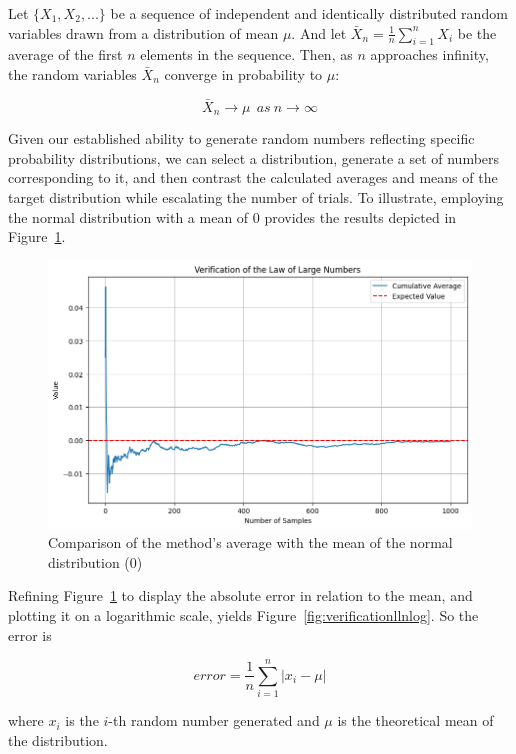\documentclass{article}
\begin{document}
\begin{theorem}
 Let \(\{X_1, X_2, ...\}\) be a sequence of independent and identically distributed random variables drawn from a distribution of mean \(\mu\). And let \(\bar{X}_n = \frac{1}{n}\sum_{i=1}^{n} X_i\) be the average of the first \(n\) elements in the sequence. Then, as \(n\) approaches infinity, the random variables \(\bar{X}_n\) converge in probability to \(\mu\):

 \begin{equation}
	 \bar{X}_n \rightarrow \mu \ \ as \ n \rightarrow \infty
\end{equation}

\end{theorem}

Given our established ability to generate random numbers reflecting specific probability distributions, we can select a distribution, generate a set of numbers corresponding to it, and then contrast the calculated averages and means of the target distribution while escalating the number of trials. To illustrate, employing the normal distribution with a mean of 0 provides the results depicted in Figure~\ref{fig:verificationlln}.

\begin{figure}[H]
	\centering
	\includegraphics[width=0.5\linewidth]{./Figures/LLN/verif.png}
	\caption{Comparison of the method's average with the mean of the normal distribution (0)}
	\label{fig:verificationlln}
\end{figure}

Refining Figure~\ref{fig:verificationlln} to display the absolute error in relation to the mean, and plotting it on a logarithmic scale, yields Figure~\ref{fig:verificationllnlog}. So the error is

\begin{equation*} error = \frac{1}{n}\sum_{i=1}^{n} | x_i - \mu | \end{equation*}

where \(x_i\) is the \(i\)-th random number generated and \(\mu\) is the theoretical mean of the distribution.
\end{document}
